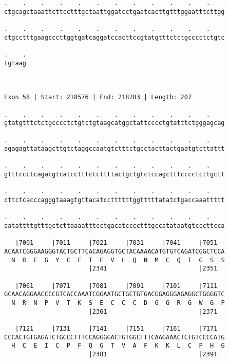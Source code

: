 \documentclass{article}
\begin{document}
\begin{Verbatim}
.    .    .    .    .    .    .    .    .    .    .    .    
ctgcagctaaattcttcctttgctaattggatcctgaatcacttgtttggaatttcttgg
                                                            
.    .    .    .    .    .    .    .    .    .    .    .    
ctgcctttgaagcccttggtgatcaggatccacttccgtatgtttctctgcccctctgtc
                                                            
.    .
tgtaag
      
      
 
Exon 58 | Start: 218576 | End: 218783 | Length: 207
 
.    .    .    .    .    .    .    .    .    .    .    .    
gtatgtttctctgcccctctgtctgtaagcatggctattcccctgtatttctgggagcag
                                                            
.    .    .    .    .    .    .    .    .    .    .    .    
agagagttataagcttgtctaggccaatgtctttctgcctacttactgaatgtcttattt
                                                            
.    .    .    .    .    .    .    .    .    .    .    .    
gtttccctcagacgtcatcctttctcttttactgctgtctccagctttcccctcttgctt
                                                            
.    .    .    .    .    .    .    .    .    .    .    .    
cttctcacccagggtaaagtgttacatccttttttggtttttatatctgaccaaattttt
                                                            
.    .    .    .    .    .    .    .    .    .    .    .    
aatattttgtttgctcttaaaatttcctgacatcccctttgccatataatgtcccttcca
                                                            
   |7001     |7011     |7021     |7031     |7041     |7051  
ACAATCGGGAAGGGTACTGCTTCACAGAGGTGCTACAAAACATGTGTCAGATCGGCTCCA
  N  R  E  G  Y  C  F  T  E  V  L  Q  N  M  C  Q  I  G  S  S
                       |2341                         |2351  
  
   |7061     |7071     |7081     |7091     |7101     |7111  
GCAACAGGAACCCCGTCACCAAATCGGAATGCTGCTGTGACGGAGGGAGAGGCTGGGGTC
  N  R  N  P  V  T  K  S  E  C  C  C  D  G  G  R  G  W  G  P
                       |2361                         |2371  
  
   |7121     |7131     |7141     |7151     |7161     |7171  
CCCACTGTGAGATCTGCCCTTTCCAGGGGACTGTGGCTTTCAAGAAACTCTGTCCCCATG
  H  C  E  I  C  P  F  Q  G  T  V  A  F  K  K  L  C  P  H  G
                       |2381                         |2391  
  

\end{Verbatim}
\end{document}
